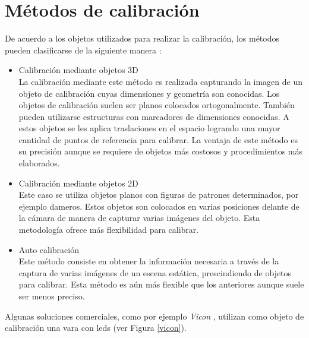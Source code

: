 \section{Métodos de calibración}

De acuerdo a los objetos utilizados para realizar la calibración, los métodos pueden clasificarse de la siguiente manera \cite{zhang_libro}:\\

\begin{itemize}
\item Calibración mediante objetos 3D\\

La calibración mediante este método es realizada capturando la imagen de un objeto de calibración cuyas dimensiones y geometría son conocidas. Los objetos de calibración suelen ser planos colocados ortogonalmente. También pueden utilizarse estructuras con marcadores de dimensiones conocidas. A estos objetos se les aplica traslaciones en el espacio logrando una mayor cantidad de puntos de referencia para calibrar. La ventaja de este método es su precisión aunque se requiere de objetos más costosos y procedimientos más elaborados.\\

\item Calibración mediante objetos 2D\\

Este caso se utiliza objetos planos con figuras de patrones determinados, por ejemplo dameros. Estos objetos son colocados en varias posiciones delante de la cámara de manera de capturar varias imágenes del objeto. Esta metodología ofrece más flexibilidad para calibrar.\\

\item Auto calibración\\

Este método consiste en obtener la información necesaria a través de la captura de varias imágenes de un escena estática, prescindiendo de objetos para calibrar. Esta método es aún más flexible que los anteriores aunque suele ser menos preciso.\\

\end{itemize}


Algunas soluciones comerciales, como por ejemplo \emph{Vicon} \cite{vicon}, utilizan como objeto de calibración una vara con leds (ver Figura \ref{vicon}). 

